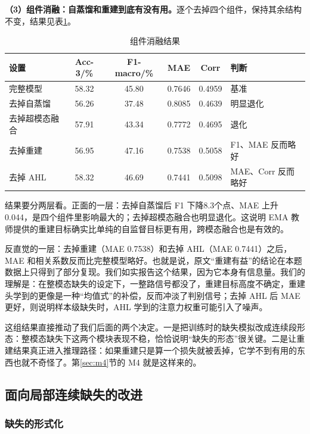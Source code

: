 \textbf{（3）组件消融：自蒸馏和重建到底有没有用。}逐个去掉四个组件，保持其余结构不变，结果见表\ref{tab:abl_comp}。

\begin{table}[htbp]
\centering
\caption{组件消融结果}
\label{tab:abl_comp}
\begin{tabular}{lccccl}
\toprule
设置 & Acc-3/\% & F1-macro/\% & MAE & Corr & 判断 \\
\midrule
完整模型 & 58.32 & 45.80 & 0.7646 & 0.4959 & 基准 \\
去掉自蒸馏 & 56.26 & 37.48 & 0.8085 & 0.4639 & 明显退化 \\
去掉超模态融合 & 57.91 & 43.34 & 0.7772 & 0.4695 & 退化 \\
去掉重建 & 56.95 & 47.16 & 0.7538 & 0.5058 & F1、MAE 反而略好 \\
去掉 AHL & 58.32 & 46.69 & 0.7441 & 0.5098 & MAE、Corr 反而略好 \\
\bottomrule
\end{tabular}
\end{table}

结果要分两层看。正面的一层：去掉自蒸馏后 F1 下降8.3个点、MAE 上升0.044，是四个组件里影响最大的；去掉超模态融合也明显退化。这说明 EMA 教师提供的重建目标确实比单纯的自监督目标更有用，跨模态融合也是有效的。

反直觉的一层：去掉重建（MAE 0.7538）和去掉 AHL（MAE 0.7441）之后，MAE 和相关系数反而比完整模型略好。也就是说，原文“重建有益”的结论在本题数据上只得到了部分复现。我们如实报告这个结果，因为它本身有信息量。我们的理解是：在整模态缺失的设定下，一整路信号都没了，重建目标高度不确定，重建头学到的更像是一种“均值式”的补偿，反而冲淡了判别信号；去掉 AHL 后 MAE 更好，则说明样本级缺失时，AHL 学到的注意力权重可能引入了噪声。

这组结果直接推动了我们后面的两个决定。一是把训练时的缺失模拟改成连续段形态：整模态缺失下这两个模块表现不稳，恰恰说明“缺失的形态”很关键。二是让重建结果真正进入推理路径：如果重建只是算一个损失就被丢掉，它学不到有用的东西也就不奇怪了。第\ref{sec:m4}节的 M4 就是这样来的。

\subsection{面向局部连续缺失的改进}\label{sec:improve}

\subsubsection{缺失的形式化}\label{sec:missdef}

